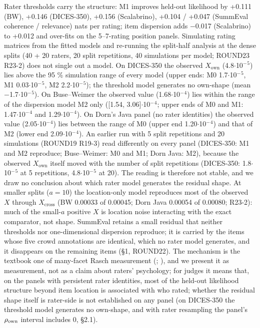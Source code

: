 \documentclass[10pt]{article}
\begin{document}
Rater thresholds carry the structure: M1 improves held-out likelihood by +0.111 (BW), +0.146 (DICES-350), +0.156 (Scalabrino), +0.104 / +0.047 (SummEval coherence / relevance) nats per rating; item dispersion adds $-$0.017 (Scalabrino) to +0.012 and over-fits on the 5--7-rating position panels. Simulating rating matrices from the fitted models and re-running the split-half analysis at the dense splits (40 + 20 raters, 20 split repetitions, 40 simulations per model; ROUND23 R23-2) does not single out a model. On DICES-350 the observed \(X_{\text{own}}\) (4.8$\cdot$10$^{-}$$^{5}$) lies above the 95 \% simulation range of every model (upper ends: M0 1.7$\cdot$10$^{-}$$^{5}$, M1 0.03$\cdot$10$^{-}$$^{5}$, M2 2.2$\cdot$10$^{-}$$^{5}$); the threshold model generates no own-shape (mean $-$1.7$\cdot$10$^{-}$$^{5}$). On Buse--Weimer the observed value (1.68$\cdot$10$^{-}$$^{4}$) lies within the range of the dispersion model M2 only ({[}1.54, 3.06{]}$\cdot$10$^{-}$$^{4}$; upper ends of M0 and M1: 1.47$\cdot$10$^{-}$$^{4}$ and 1.29$\cdot$10$^{-}$$^{4}$). On Dorn's Java panel (no rater identities) the observed value (2.05$\cdot$10$^{-}$$^{4}$) lies between the range of M0 (upper end 1.20$\cdot$10$^{-}$$^{4}$) and that of M2 (lower end 2.09$\cdot$10$^{-}$$^{4}$). An earlier run with 5 split repetitions and 20 simulations (ROUND19 R19-3) read differently on every panel (DICES-350: M1 and M2 reproduce; Buse--Weimer: M0 and M1; Dorn Java: M2), because the observed \(X_{\text{own}}\) itself moved with the number of split repetitions (DICES-350: 1.8$\cdot$10$^{-}$$^{5}$ at 5 repetitions, 4.8$\cdot$10$^{-}$$^{5}$ at 20). The reading is therefore not stable, and we draw no conclusion about which rater model generates the residual shape. At smaller splits (\(a=10\)) the location-only model reproduces most of the observed \(X\) through \(X_{\text{cross}}\) (BW 0.00033 of 0.00045; Dorn Java 0.00054 of 0.00080; R23-2): much of the small-\(a\) positive \(X\) is location noise interacting with the exact comparator, not shape. SummEval retains a small residual that neither thresholds nor one-dimensional dispersion reproduce; it is carried by the items whose five crowd annotations are identical, which no rater model generates, and it disappears on the remaining items (\S{}1, ROUND22). The mechanism is the textbook one of many-facet Rasch measurement (\citealp{linacre1989mfrm}; \citealp{eckes2011mfrm}), and we present it as measurement, not as a claim about raters' psychology; for judges it means that, on the panels with persistent rater identities, most of the held-out likelihood structure beyond item location is associated with who rated; whether the residual shape itself is rater-side is not established on any panel (on DICES-350 the threshold model generates no own-shape, and with rater resampling the panel's \(\rho_{\rm own}\) interval includes 0, \S{}2.1).
\end{document}
